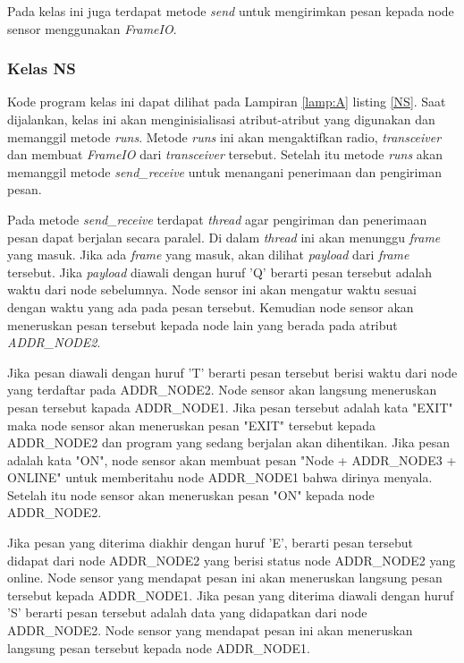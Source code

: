 Pada kelas ini juga terdapat metode \textit{send} untuk mengirimkan pesan kepada node sensor menggunakan \textit{FrameIO}.

\subsubsection{Kelas NS}
Kode program kelas ini dapat dilihat pada Lampiran \ref{lamp:A} listing \ref{NS}. Saat dijalankan, kelas ini akan menginisialisasi atribut-atribut yang digunakan dan memanggil metode \textit{runs}. Metode \textit{runs} ini akan mengaktifkan radio, \textit{transceiver} dan membuat \textit{FrameIO} dari \textit{transceiver} tersebut. Setelah itu metode \textit{runs} akan memanggil metode \textit{send\_receive} untuk menangani penerimaan dan pengiriman pesan.

Pada metode \textit{send\_receive} terdapat \textit{thread} agar pengiriman dan penerimaan pesan dapat berjalan secara paralel. Di dalam \textit{thread} ini akan menunggu \textit{frame} yang masuk. Jika ada \textit{frame} yang masuk, akan dilihat \textit{payload} dari \textit{frame} tersebut. Jika \textit{payload} diawali dengan huruf 'Q' berarti pesan tersebut adalah waktu dari node sebelumnya. Node sensor ini akan mengatur waktu sesuai dengan waktu yang ada pada pesan tersebut. Kemudian node sensor akan meneruskan pesan tersebut kepada node lain yang berada pada atribut \textit{ADDR\_NODE2}.

Jika pesan diawali dengan huruf 'T' berarti pesan tersebut berisi waktu dari node yang terdaftar pada ADDR\_NODE2. Node sensor akan langsung meneruskan pesan tersebut kapada ADDR\_NODE1. Jika pesan tersebut adalah kata "EXIT" maka node sensor akan meneruskan pesan "EXIT" tersebut kepada ADDR\_NODE2 dan program yang sedang berjalan akan dihentikan. Jika pesan adalah kata "ON", node sensor akan membuat pesan "Node + ADDR\_NODE3 + ONLINE" untuk memberitahu node ADDR\_NODE1 bahwa dirinya menyala. Setelah itu node sensor akan meneruskan pesan "ON" kepada node ADDR\_NODE2.

Jika pesan yang diterima diakhir dengan huruf 'E', berarti pesan tersebut didapat dari node ADDR\_NODE2 yang berisi status node ADDR\_NODE2 yang online. Node sensor yang mendapat pesan ini akan meneruskan langsung pesan tersebut kepada ADDR\_NODE1. Jika pesan yang diterima diawali dengan huruf 'S' berarti pesan tersebut adalah data yang didapatkan dari node ADDR\_NODE2. Node sensor yang mendapat pesan ini akan meneruskan langsung pesan tersebut kepada node ADDR\_NODE1. 

